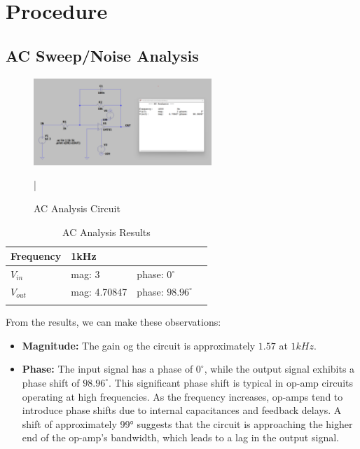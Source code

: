 \chapter{Procedure}

\section{AC Sweep/Noise Analysis}

\begin{figure}[h]
    \centering
    \includegraphics[width=0.6\textwidth]{assets/p1-1k.png}
    \caption{AC Analysis Circuit}
    \label{fig:ac-analysis-circuit}
|\end{figure}

\begin{table}[h]
    \centering
    \begin{tabular}{llll}
    \cline{1-2}
    \multicolumn{1}{|l|}{Frequency} & \multicolumn{1}{l|}{1kHz} &             &                              \\ \hline
    \multicolumn{1}{|l|}{$V_{in}$}     & mag: 3                    & phase: $0^{\circ}$    & \multicolumn{1}{l|}{} \\ \hline
    \multicolumn{1}{|l|}{$V_{out}$}    & mag: 4.70847               & phase: $98.96^{\circ}$ & \multicolumn{1}{l|}{} \\ \hline
                                    &                           &             &                             
    \end{tabular}
    \caption{AC Analysis Results}
    \label{tab:ac-sweep-analysis-results}
\end{table}

From the results, we can make these observations:

\begin{itemize}
    \item \textbf{Magnitude:} The gain og the circuit is approximately $1.57$ at $1kHz$. 
    \item \textbf{Phase:} The input signal has a phase of $0^{\circ}$, while the output signal exhibits a phase shift of $98.96^{\circ}$. This significant phase shift is typical in op-amp circuits operating at high frequencies. As the frequency increases, op-amps tend to introduce phase shifts due to internal capacitances and feedback delays. A shift of approximately 99° suggests that the circuit is approaching the higher end of the op-amp’s bandwidth, which leads to a lag in the output signal.
\end{itemize}

